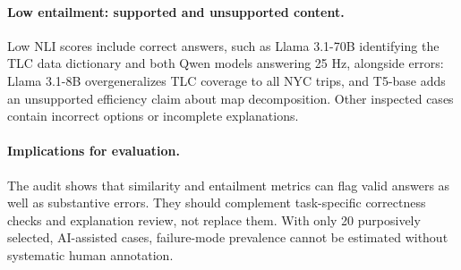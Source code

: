 \documentclass[a4paper,fleqn]{cas-sc}
\begin{document}
\paragraph{Low entailment: supported and unsupported content.}
Low NLI scores include correct answers, such as Llama 3.1-70B identifying the TLC data dictionary and both Qwen models answering 25 Hz, alongside errors: Llama 3.1-8B overgeneralizes TLC coverage to all NYC trips, and T5-base adds an unsupported efficiency claim about map decomposition. Other inspected cases contain incorrect options or incomplete explanations.

\paragraph{Implications for evaluation.}
The audit shows that similarity and entailment metrics can flag valid answers as well as substantive errors. They should complement task-specific correctness checks and explanation review, not replace them. With only 20 purposively selected, AI-assisted cases, failure-mode prevalence cannot be estimated without systematic human annotation.



\end{document}
